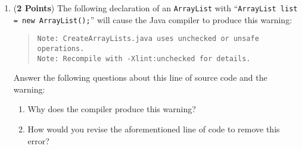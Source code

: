 \documentclass[12pt]{article}
\begin{document}
\begin{enumerate}
\begin{enumerate}
  \item ({\bf 2 Points}) The following declaration of an {\tt ArrayList} with ``{\tt ArrayList list = new
      ArrayList();}'' will cause the Java compiler to produce this warning:
    
    \begin{quote}
      \begin{verbatim}
Note: CreateArrayLists.java uses unchecked or unsafe operations.
Note: Recompile with -Xlint:unchecked for details.
      \end{verbatim}
    \end{quote}

  \vspace*{-.25in}
  Answer the following questions about this line of source code and the warning:

  \begin{enumerate}

    \item Why does the compiler produce this warning?
      
    \item How would you revise the aforementioned line of code to remove this error?

  \end{enumerate}

  \end{enumerate}

 

    \end{enumerate}

  
\end{document}
